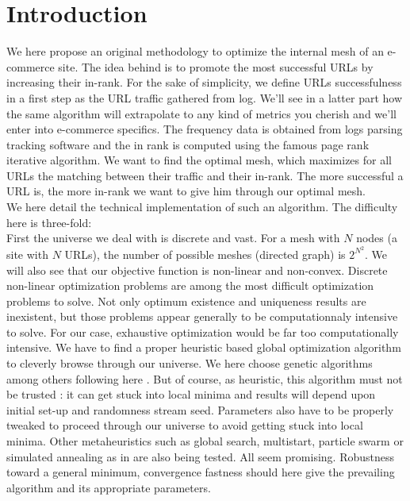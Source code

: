 \documentclass{iSWAGArticle}
\begin{document}
  \section{Introduction}
  We here propose an original methodology to optimize the internal mesh of an e-commerce site.
  The idea behind is to promote the most successful URLs by increasing their in-rank.  
  For the sake of simplicity, we define URLs successfulness in a first step as the URL traffic gathered from log.
  We'll see in a latter part how the same algorithm will extrapolate to any kind of metrics you cherish and we'll enter into e-commerce specifics.
  The frequency data is obtained from logs parsing tracking software and the in rank is computed using the famous page rank iterative algorithm.  
  We want to find the optimal mesh, which maximizes for all URLs the matching between their traffic and their in-rank. 
  The more successful a URL is, the more in-rank we want to give him through our optimal mesh.
  \\\newline
  We here detail the technical implementation of such an algorithm.
  The difficulty here is three-fold:
  \\
  \indent
  First the universe we deal with is discrete and vast. For a mesh with $N$ nodes (a site with $N$ URLs), the number of possible meshes (directed graph) is $2^{N^{2}}$. 
  We will also see that our objective function is non-linear and non-convex.  Discrete non-linear optimization problems are among the most difficult optimization problems to solve. 
  Not only optimum existence and uniqueness results are inexistent, but those problems appear generally to be computationnaly intensive to solve. 
  For our case, exhaustive optimization would be far too computationally intensive. We have to find a proper heuristic based global optimization algorithm to cleverly browse through our universe.
  We here choose genetic algorithms among others following here \cite{gen_algo_web}. 
  But of course, as heuristic, this algorithm must not be trusted : it can get stuck into local minima and results will depend upon initial set-up and randomness stream seed. 
  Parameters also have to be properly tweaked to proceed through our universe to avoid getting stuck into local minima.
  Other metaheuristics such as global search, multistart, particle swarm or simulated annealing as in \cite{sim_annealing} 
  are also being tested. All seem promising. Robustness toward a general minimum, convergence fastness should here give the prevailing algorithm and its appropriate parameters. 
\end{document}

